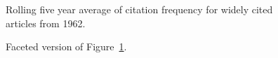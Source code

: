 \documentclass[
  10pt,
  letterpaper,
  DIV=11,
  numbers=noendperiod,
  twoside]{scrartcl}
\begin{document}
\begin{figure}


\caption{\label{fig-citation-spaghetti-1962}Rolling five year average of
citation frequency for widely cited articles from 1962.}

\end{figure}%

\begin{figure}


\caption{\label{fig-citation-facet-1962}Faceted version of
Figure~\ref{fig-citation-spaghetti-1962}.}

\end{figure}%
\end{document}
